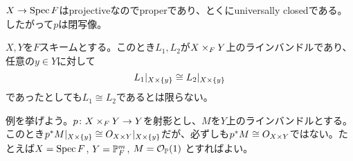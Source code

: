 \begin{comment}
\begin{que} ${}$
  \begin{description}
    \item[(1)]「To conclude the proof, we here use some properties of the Jacobian variety $J$ of $X$,」とありますが、$X$のヤコビ多様体とはなんでしょうか。（定義がわかりません）そしてここで使う性質とは何でしょうか。
    \item[(2)] 「$L$ has degree zero on each fiber of $X \times (Y \times Z) \to Y \times Z$. 」とあります。これはどうしてでしょうか。
    Hartshorneの引用された定理を見ると、Hilbert多項式がからんでいるようなのですが、そこから先に進めません。
    \item[(3)] 「Thus $L$ defines a morphism $f \colon Y \times Z \to J.$」とありますが、これはなぜでしょうか。どういう射でしょうか。
  \end{description}
  以上です。
\end{que}
\end{comment}


\begin{rem}
  $X \to \Spec F$はprojectiveなのでproperであり、とくにuniversally closedである。したがって$p$は閉写像。
\end{rem}

\begin{rem}
$X,Y$を$F$スキームとする。このとき$L_1,L_2$が$X \tm_F Y$上のラインバンドルであり、任意の$y \in Y$に対して
\[
L_1 |_{X \tm \{y\}} \cong L_2 |_{X \tm \{y\}}
\]
であったとしても$L_1 \cong L_2$であるとは限らない。

例を挙げよう。$p \colon X \tm_F Y \to Y$を射影とし、$M$を$Y$上のラインバンドルとする。このとき$p^* M |_{X \tm \{y\}} \cong O_{X \tm Y}|_{X \tm \{y\} }$だが、必ずしも$p^* M \cong O_{X \tm Y}$ではない。たとえば$X = \Spec F$, $Y = \P_F^m$, $M = \calo_{\P}(1)$
とすればよい。
\end{rem}



